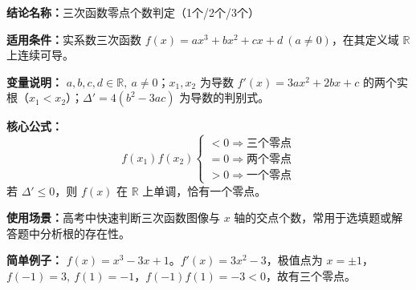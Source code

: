 \textbf{结论名称：}三次函数零点个数判定（1个/2个/3个）

\textbf{适用条件：}实系数三次函数 \(f(x)=ax^{3}+bx^{2}+cx+d\ (a\neq0)\)，在其定义域 \(\mathbb{R}\) 上连续可导。

\textbf{变量说明：} \(a,b,c,d\in\mathbb{R},\ a\neq0\)；\(x_1,x_2\) 为导数 \(f'(x)=3ax^{2}+2bx+c\) 的两个实根（\(x_1<x_2\)）；\(\Delta'=4(b^{2}-3ac)\) 为导数的判别式。

\textbf{核心公式：}
\[
\boxed{
f(x_1)f(x_2)
\begin{cases}
<0 \Rightarrow \text{三个零点}\\[2pt]
=0 \Rightarrow \text{两个零点}\\[2pt]
>0 \Rightarrow \text{一个零点}
\end{cases}
}
\]
若 \(\Delta'\le 0\)，则 \(f(x)\) 在 \(\mathbb{R}\) 上单调，恰有一个零点。

\textbf{使用场景：}高考中快速判断三次函数图像与 \(x\) 轴的交点个数，常用于选填题或解答题中分析根的存在性。

\textbf{简单例子：} \(f(x)=x^{3}-3x+1\)。\(f'(x)=3x^{2}-3\)，极值点为 \(x=\pm1\)，\(f(-1)=3,\ f(1)=-1\)，\(f(-1)f(1)=-3<0\)，故有三个零点。
